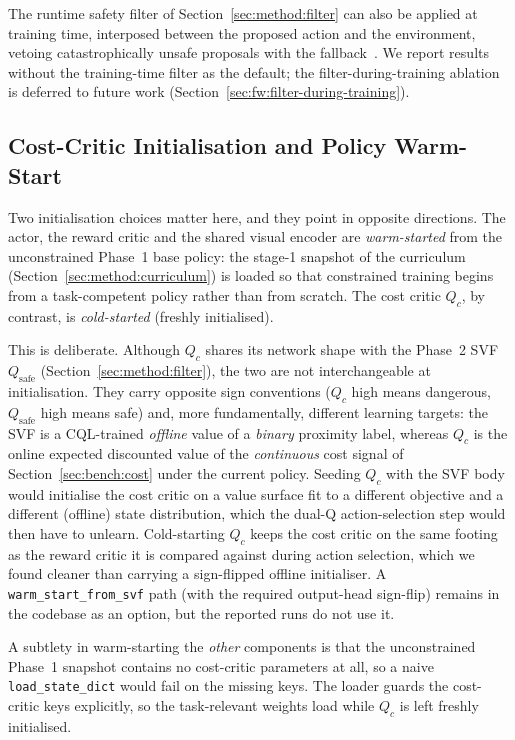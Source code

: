 \documentclass[11pt,a4paper]{report}
\begin{document}
The runtime safety filter of Section~\ref{sec:method:filter} can
also be applied at training time, interposed between the proposed
action and the environment, vetoing catastrophically unsafe
proposals with the fallback~\cite{cbfrl2024,shield2025}. We report
results without the training-time filter as the default; the
filter-during-training ablation is deferred to future work
(Section~\ref{sec:fw:filter-during-training}).

\subsection{Cost-Critic Initialisation and Policy Warm-Start}
\label{sec:method:lagrangian:warmstart}

Two initialisation choices matter here, and they point in opposite
directions. The actor, the reward critic and the shared visual encoder
are \emph{warm-started} from the unconstrained Phase~1 base policy: the
stage-1 snapshot of the curriculum
(Section~\ref{sec:method:curriculum}) is loaded so that constrained
training begins from a task-competent policy rather than from scratch.
The cost critic $Q_c$, by contrast, is \emph{cold-started} (freshly
initialised).

This is deliberate. Although $Q_c$ shares its network shape with the
Phase~2 SVF $Q_{\mathrm{safe}}$ (Section~\ref{sec:method:filter}), the
two are not interchangeable at initialisation. They carry opposite
sign conventions ($Q_c$ high means dangerous, $Q_{\mathrm{safe}}$ high
means safe) and, more fundamentally, different learning targets: the
SVF is a CQL-trained \emph{offline} value of a \emph{binary} proximity
label, whereas $Q_c$ is the online expected discounted value of the
\emph{continuous} cost signal of Section~\ref{sec:bench:cost} under the
current policy. Seeding $Q_c$ with the SVF body would initialise the
cost critic on a value surface fit to a different objective and a
different (offline) state distribution, which the dual-Q
action-selection step would then have to unlearn. Cold-starting $Q_c$
keeps the cost critic on the same footing as the reward critic it is
compared against during action selection, which we found cleaner than
carrying a sign-flipped offline initialiser. A
\texttt{warm\_start\_from\_svf} path (with the required output-head
sign-flip) remains in the codebase as an option, but the reported runs
do not use it.

A subtlety in warm-starting the \emph{other} components is that the
unconstrained Phase~1 snapshot contains no cost-critic parameters at
all, so a naive \texttt{load\_state\_dict} would fail on the missing
keys. The loader guards the cost-critic keys explicitly, so the
task-relevant weights load while $Q_c$ is left freshly initialised.
\end{document}
